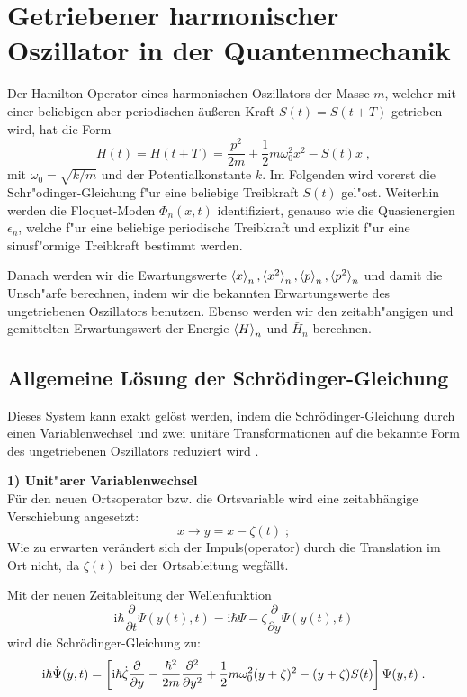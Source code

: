 \chapter{Getriebener harmonischer Oszillator in der Quantenmechanik}
  Der Hamilton-Operator eines harmonischen Oszillators der Masse $m$, welcher mit einer beliebigen aber periodischen äußeren Kraft $S(t)=S(t+T)$ getrieben wird, hat die Form
  \begin{equation}
    H(t) = H(t+T) = \frac{p^2}{2m} + \frac{1}{2}m\omega_0^2x^2-S(t)x \; ,
  \end{equation}
  mit $\omega_0=\sqrt{k/m}$ und der Potentialkonstante $k$.
  Im Folgenden wird vorerst die Schr"odinger-Gleichung f"ur eine beliebige Treibkraft $S(t)$ gel"ost.
  Weiterhin werden die Floquet-Moden $\Phi_n(x,t)$ identifiziert, genauso wie die Quasienergien $\epsilon_n$, welche f"ur eine beliebige periodische Treibkraft und explizit f"ur eine sinusf"ormige Treibkraft bestimmt werden.

  Danach werden wir die Ewartungswerte $\braket{x}_n,\braket{x^2}_n,\braket{p}_n,\braket{p^2}_n$ und damit die Unsch"arfe berechnen, indem wir die bekannten Erwartungswerte des ungetriebenen Oszillators benutzen.
  Ebenso werden wir den zeitabh"angigen und gemittelten Erwartungswert der Energie $\braket{H}_n$ und $\bar H_n$ berechnen.



\section{Allgemeine Lösung der Schrödinger-Gleichung}
  \label{lsg_einzelner}
  Dieses System kann exakt gelöst werden, indem die Schrödinger-Gleichung durch einen Variablenwechsel und zwei unitäre Transformationen auf die bekannte Form des ungetriebenen Oszillators reduziert wird \cite{haenggi}.

  \textbf{1) Unit"arer Variablenwechsel}\\
  Für den neuen Ortsoperator bzw. die Ortsvariable wird eine zeitabhängige Verschiebung angesetzt:
  \begin{equation}
    x \rightarrow y=x-\zeta(t) \; ;
  \end{equation}
  Wie zu erwarten verändert sich der Impuls(operator) durch die Translation im Ort nicht, da $\zeta(t)$ bei der Ortsableitung wegfällt.

  Mit der neuen Zeitableitung der Wellenfunktion
  \begin{equation}
    \text{i}\hbar \frac{\partial}{\partial t} \Psi(y(t),t) = \text{i}\hbar \dot{\Psi} -\dot{\zeta}\frac{\partial}{\partial y}\Psi(y(t),t)
  \end{equation}
  wird die Schrödinger-Gleichung zu:
  \begin{equation}
    \text i \hbar \dot{\Psi}(y,t) = \left[\text i \hbar \dot{\zeta}\frac{\partial}{\partial y}-\frac{\hbar^2}{2m}\frac{\partial^2}{\partial y^2}+\frac{1}{2}m\omega_0^2(y+\zeta)^2-(y+\zeta)S(t)\right]\Psi(y,t) \; .
    \label{schroedinger_einzeln_getrieben}
  \end{equation}

